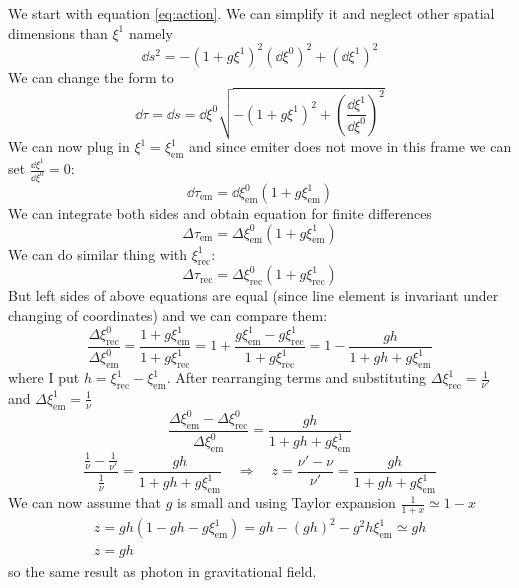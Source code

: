 We start with equation \autoref{eq:action}. We can simplify it and neglect other
spatial dimensions than $\xi^1$ namely
%
\begin{equation}
	\dd s^2 = -(1+g\xi^1)^2 (\dd\xi^0)^2 + (\dd\xi^1)^2
\end{equation}
%
We can change the form to
%
\begin{equation}
	\dd \tau = \dd s = \dd\xi^0 \sqrt{-(1+g\xi^1)^2 + \left(\frac{\dd\xi^1}{\dd\xi^0}\right)^2}
\end{equation}
%
We can now plug in $\xi^1 = \xi^1_\text{em}$ and since emiter does not move in
this frame we can set $\frac{\dd\xi^1}{\dd\xi^0} = 0$:
%
\begin{equation}
	\dd \tau_\text{em} = \dd\xi^0_\text{em} (1+g\xi^1_\text{em})
\end{equation}
%
We can integrate both sides and obtain equation for finite differences
%
\begin{equation}
	\Delta \tau_\text{em} = \Delta \xi^0_\text{em} (1+g\xi^1_\text{em})
\end{equation}
%
We can do similar thing with $\xi^1_\text{rec}$:
%
\begin{equation}
	\Delta \tau_\text{rec} = \Delta \xi^0_\text{rec} (1+g\xi^1_\text{rec})
\end{equation}
%
But left sides of above equations are equal (since line element is invariant
under changing of coordinates) and we can compare them:
%
\begin{equation}
	\frac{\Delta \xi^0_\text{rec}}{\Delta \xi^0_\text{em}} =
	\frac{1+g\xi^1_\text{em}}{1+g\xi^1_\text{rec}} =
	1 + \frac{g\xi^1_\text{em} - g\xi^1_\text{rec}}{1+g\xi^1_\text{rec}} =
	1 - \frac{gh}{1+gh+g\xi^1_\text{em}}
\end{equation}
%
where I put $h = \xi^1_\text{rec} - \xi^1_\text{em}$. After rearranging terms and
substituting $\Delta \xi_\text{rec}^1 = \frac{1}{\nu'}$ and $\Delta
	\xi_\text{em}^1 = \frac{1}{\nu}$
%
\begin{equation}
	\frac{\Delta \xi^0_\text{em} - \Delta \xi^0_\text{rec}}{\Delta \xi^0_\text{em}} =
	\frac{gh}{1+gh+g\xi^1_\text{em}}
\end{equation}
%
\begin{equation}
	\frac{\frac{1}{\nu} - \frac{1}{\nu'}}{\frac{1}{\nu}} =
	\frac{gh}{1+gh+g\xi^1_\text{em}}
	\quad \Rightarrow \quad
	z = \frac{\nu' - \nu}{\nu'} = \frac{gh}{1+gh+g\xi^1_\text{em}}
\end{equation}
%
We can now assume that $g$ is small and using Taylor expansion $\frac{1}{1+x}
	\simeq 1-x$
%
\begin{gather}
	z = gh(1-gh-g\xi^1_\text{em}) = gh - (gh)^2 - g^2h\xi^1_\text{em} \simeq gh \nonumber \\
	z = gh
\end{gather}
%
so the same result as photon in gravitational field.